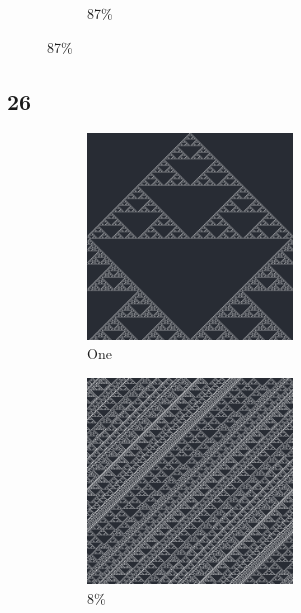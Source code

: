 \documentclass[12pt, fleqn]{report}                             %
\theoremstyle{break}                                            %
\begin{document}
\begin{figure}[ht!]
\begin{subfigure}[b]{0.4\linewidth}
          \caption{87\%}
        \end{subfigure}
      \end{figure}

      \clearpage
      \subsection{26}
      \begin{figure}[ht!]
        \centering
        \begin{subfigure}[b]{0.4\linewidth}
          \includegraphics[width=0.6\textwidth]{Images/26/a.png}
          \caption{One}
        \end{subfigure}
        \begin{subfigure}[b]{0.4\linewidth}
          \includegraphics[width=0.6\textwidth]{Images/26/b.png}
          \caption{8\%}
        \end{subfigure}
        \begin{subfigure}[b]{0.4\linewidth}

\end{subfigure}
\end{figure}
\end{document}
